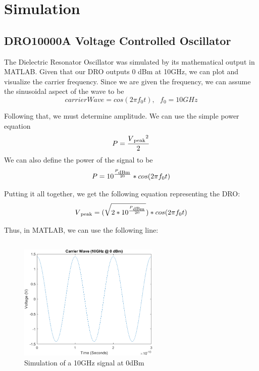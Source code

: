 \section{Simulation}

\subsection{DRO10000A Voltage Controlled Oscillator} \label{DROSimulation}
The Dielectric Resonator Oscillator was simulated by its mathematical output in MATLAB. Given that our DRO outputs 0 dBm at 10GHz, we can plot and visualize the carrier frequency. Since we are given the frequency, we can assume the sinusoidal aspect of the wave to be 
\begin{equation}
    carrierWave = cos(2\pi f_0 t), \ \ \ f_0 = 10GHz
\end{equation}

Following that, we must determine amplitude. We can use the simple power equation
\begin{equation}
    P = \frac{V\textsubscript{peak}^2}{2}
\end{equation}
We can also define the power of the signal to be
\begin{equation}
    P = 10^{\frac{P\textsubscript{dBm}}{20}}*cos(2\pi f_0 t)
\end{equation}

Putting it all together, we get the following equation representing the DRO:
\begin{equation}
    V\textsubscript{peak} = (\sqrt{2* 10^{\frac{P\textsubscript{dBm}}{20}}}) * cos(2\pi f_0 t)
\end{equation}

Thus, in MATLAB, we can use the following line:
\inputminted[breaklines]{Matlab}{./Code/DRO_Simulation.m}

\begin{figure}[H]
    \centering
    \includegraphics[width = 0.6\textwidth]{Images/CarriervTime.png}
    \caption{Simulation of a 10GHz signal at 0dBm}
    \label{fig:carrierVTime}
\end{figure}


